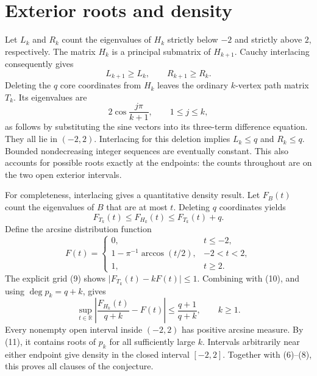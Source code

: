 \documentclass[11pt]{article}
\newcommand{\R}{\mathbb R}
\begin{document}
\section*{Exterior roots and density}
Let \(L_k\) and \(R_k\) count the eigenvalues of \(H_k\)
strictly below \(-2\) and strictly above \(2\), respectively.
The matrix \(H_k\) is a principal submatrix of \(H_{k+1}\).
Cauchy interlacing consequently gives
\[
 L_{k+1}\ge L_k,\qquad R_{k+1}\ge R_k.                 \tag{8}
\]
Deleting the \(q\) core coordinates from \(H_k\) leaves the
ordinary \(k\)-vertex path matrix \(T_k\). Its eigenvalues are
\[
                  2\cos\frac{j\pi}{k+1},\qquad 1\le j\le k,
                                                               \tag{9}
\]
as follows by substituting the sine vectors into its three-term
difference equation. They all lie in \((-2,2)\).
Interlacing for this deletion implies
\(L_k\le q\) and \(R_k\le q\).
Bounded nondecreasing integer sequences are eventually constant.
This also accounts for possible roots exactly at the endpoints:
the counts throughout are on the two open exterior intervals.

For completeness, interlacing gives a quantitative density result.
Let \(F_B(t)\) count the eigenvalues of \(B\) that are at most \(t\).
Deleting \(q\) coordinates yields
\[
                   F_{T_k}(t)\le F_{H_k}(t)\le F_{T_k}(t)+q.
                                                               \tag{10}
\]
Define the arcsine distribution function
\[
 F(t)=\begin{cases}
 0,&t\le-2,\\
 1-\pi^{-1}\arccos(t/2),&-2<t<2,\\
 1,&t\ge2.
 \end{cases}
\]
The explicit grid (9) shows
\(\lvert F_{T_k}(t)-kF(t)\rvert\le1\). Combining with
(10), and using \(\deg p_k=q+k\), gives
\[
 \sup_{t\in\R}\left|
 \frac{F_{H_k}(t)}{q+k}-F(t)\right|
 \le\frac{q+1}{q+k},\qquad k\ge1.                    \tag{11}
\]
Every nonempty open interval inside \((-2,2)\) has positive
arcsine measure. By (11), it contains roots of \(p_k\) for
all sufficiently large \(k\). Intervals arbitrarily near either
endpoint give density in the closed interval \([-2,2]\).
Together with (6)--(8), this proves all clauses of the conjecture.
\end{document}
